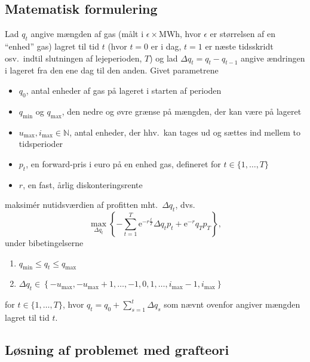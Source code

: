 \documentclass[12pt,oneside,final]{article}
\newcommand{\N}{\mathbb{N}}
\newcommand{\1}{\mathbbm{1}}
\newcommand{\e}{\mathrm{e}}
\begin{document}
\subsection{Matematisk formulering}

Lad \(q_{t}\) angive mængden af gas (målt i \(\epsilon\times\)MWh, hvor \(\epsilon\) er størrelsen af en ``enhed'' gas) lagret til tid \(t\) (hvor \(t = 0\) er i dag, \(t = 1\) er næste tidsskridt osv.\ indtil slutningen af lejeperioden, \(T\)) og lad \(\Delta q_{t} = q_{t} - q_{t-1}\) angive ændringen i lageret fra den ene dag til den anden.
Givet parametrene
%
\begin{itemize}
\item \(q_{0}\), antal enheder af gas på lageret i starten af perioden
\item \(q_{\min}\) og \(q_{\max}\), den nedre og øvre grænse på mængden, der kan være på lageret
\item \(u_{\max}, i_{\max} \in \N\), antal enheder, der hhv.\ kan tages ud og sættes ind mellem to tidsperioder
\item \(p_{t}\), en forward-pris i euro på en enhed gas, defineret for \(t \in \{1, \dotsc, T\}\)
\item \(r\), en fast, årlig diskonteringsrente
\end{itemize}
%
maksimér nutidsværdien af profitten mht.\ \(\Delta q_{t}\), dvs.\
%
\begin{equation}
  \label{eq:1}
  \max_{\Delta q_{t}}
  \left\{
    - \sum_{t = 1}^{T} \e^{-r\tfrac{t}{T}} \Delta q_{t} p_{t} + \e^{-r} q_{T} p_{T}
  \right\} ,
\end{equation}
under bibetingelserne
\begin{enumerate}
\item \(q_{\min} \leq q_{t} \leq q_{\max}\)
\item \(\Delta q_{t} \in
    \left\{
    -u_{\max}, -u_{\max}+1, \dotsc, -1, 0, 1, \dotsc, i_{\max} - 1, i_{\max}
    \right\}\)
\end{enumerate}
%
for \(t \in \{1, \dotsc, T\}\), hvor \(q_{t} = q_{0} + \sum_{s = 1}^{t} \Delta q_{s}\) som nævnt ovenfor angiver mængden lagret til tid \(t\).


\clearpage
\subsection{Løsning af problemet med grafteori}
\end{document}
